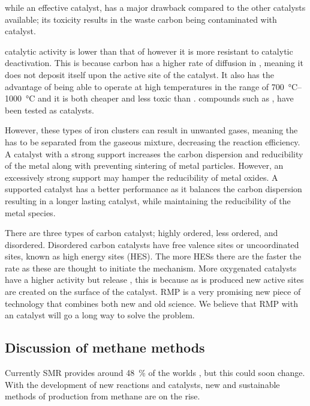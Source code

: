  while an effective catalyst, has a major drawback compared to the other catalysts available; its toxicity results in the waste carbon being contaminated with  catalyst.
 
 catalytic activity is lower than that of  however it is more resistant to catalytic deactivation.
This is because carbon has a higher rate of diffusion in , meaning it does not deposit itself upon the active site of the catalyst.
It also has the advantage of being able to operate at high temperatures in the range of \SIrange{700}{1000}{\celsius} and it is both cheaper and less toxic than .
 compounds such as \ce{[Fe(CO)5]}, \ce{[Fe(cp)2]} have been tested as catalysts.

However, these types of iron clusters can result in unwanted gases, meaning the  has to be separated from the gaseous mixture, decreasing the reaction efficiency.
A catalyst with a strong support increases the carbon dispersion and reducibility of the metal along with preventing sintering of metal particles.
However, an excessively strong support may hamper the reducibility of metal oxides.
A supported catalyst has a better performance as it balances the carbon dispersion resulting in a longer lasting catalyst, while maintaining the reducibility of the metal species.

There are three types of carbon catalyst; highly ordered, less ordered, and disordered.
Disordered carbon catalysts have free valence sites or uncoordinated sites, known as high energy sites (HES).
The more HESs there are the faster the rate as these are thought to initiate the mechanism.
More oxygenated catalysts have a higher activity but release , this is because as  is produced new active sites are created on the surface of the catalyst.
RMP is a very promising new piece of technology that combines both new and old science.
We believe that RMP with an  catalyst will go a long way to solve the  problem.

\subsection{Discussion of methane methods}%
\label{sub:discussion_of_methane_methods}
Currently SMR provides around \SI{48}{\percent} of the worlds \cite{SBN2020}, but this could soon change.
With the development of new reactions and catalysts, new and sustainable methods of  production from methane are on the rise.

